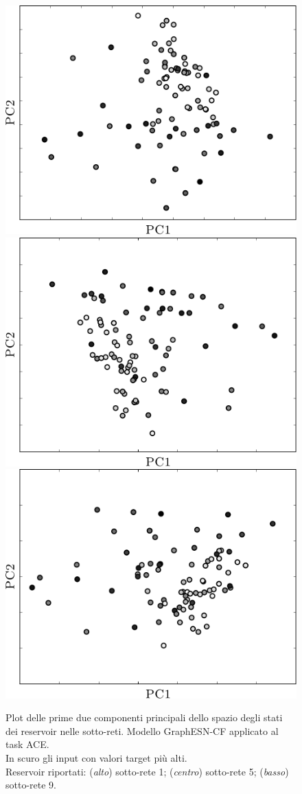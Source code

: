 %
\begin{figure}[p]
\centering
\includegraphics[width=0.5\columnwidth]{img/pca/pca-ace-nofof1}\\
\vspace*{0.8cm}
\includegraphics[width=0.5\columnwidth]{img/pca/pca-ace-nofof2}\\
\vspace*{0.8cm}
\includegraphics[width=0.5\columnwidth]{img/pca/pca-ace-nofof3}\\
\medskip
\caption[PCA dei reservoir. GraphESN-CF su ACE.]{Plot delle prime due componenti principali dello spazio degli stati dei reservoir nelle sotto-reti. Modello GraphESN-CF applicato al task ACE.\\ 
In scuro gli input con valori target più alti.\\
Reservoir riportati: (\emph{alto}) sotto-rete 1; (\emph{centro}) sotto-rete 5; (\emph{basso}) sotto-rete 9.}
\label{fig:esperimenti:pca-ace-nofof}
\end{figure}

